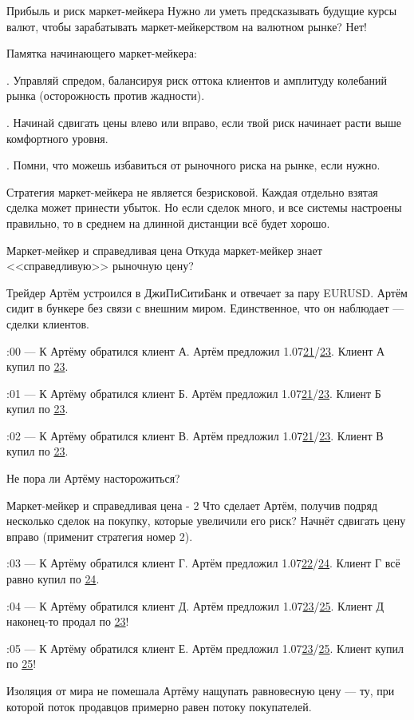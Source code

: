 \documentclass{beamer}
\begin{document}
\begin{frame}{Прибыль и риск маркет-мейкера}
\justify
Нужно ли уметь предсказывать будущие курсы валют, чтобы зарабатывать маркет-мейкерством на валютном рынке? Нет!

\justify
Памятка начинающего маркет-мейкера:

. Управляй спредом, балансируя риск оттока клиентов и амплитуду колебаний рынка (осторожность против жадности).

. Начинай сдвигать цены влево или вправо, если твой риск начинает расти выше комфортного уровня.

. Помни, что можешь избавиться от рыночного риска на рынке, если нужно.

\justify
Стратегия маркет-мейкера не является безрисковой. Каждая отдельно взятая сделка
может принести убыток. Но если сделок много, и все системы настроены правильно,
то в среднем на длинной дистанции всё будет хорошо.
\end{frame}



\begin{frame}{Маркет-мейкер и справедливая цена}
\justify
Откуда маркет-мейкер знает <<справедливую>> рыночную цену?

\justify
Трейдер Артём устроился в ДжиПиСитиБанк и отвечает за пару EURUSD. Артём сидит в бункере без связи с внешним миром. Единственное, что он наблюдает --- сделки клиентов.

:00 --- К Артёму обратился клиент А. Артём предложил 1.07\underline{21}/\underline{23}. Клиент А купил по \underline{23}.

:01 --- К Артёму обратился клиент Б. Артём предложил 1.07\underline{21}/\underline{23}. Клиент Б купил по \underline{23}.

:02 --- К Артёму обратился клиент В. Артём предложил 1.07\underline{21}/\underline{23}. Клиент В купил по \underline{23}.

\justify
Не пора ли Артёму насторожиться?
\end{frame}



\begin{frame}{Маркет-мейкер и справедливая цена - 2}
\justify
Что сделает Артём, получив подряд несколько сделок на покупку, которые увеличили 
его риск? Начнёт сдвигать цену вправо (применит стратегия номер 2).

:03 --- К Артёму обратился клиент Г. Артём предложил 1.07\underline{22}/\underline{24}. Клиент Г всё равно купил по \underline{24}.

:04 --- К Артёму обратился клиент Д. Артём предложил 1.07\underline{23}/\underline{25}. Клиент Д наконец-то продал по \underline{23}!

:05 --- К Артёму обратился клиент Е. Артём предложил 1.07\underline{23}/\underline{25}. Клиент купил по \underline{25}!

\justify
Изоляция от мира не помешала Артёму нащупать равновесную цену --- ту, при которой поток продавцов примерно равен потоку покупателей.
\end{frame}
\end{document}
